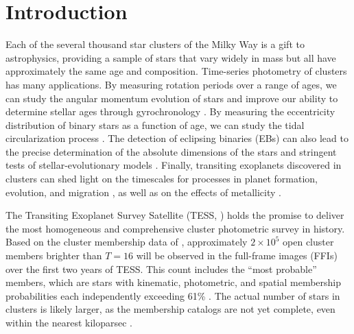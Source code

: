 \documentclass[12pt,twocolumn,tighten,trackchanges]{aastex62}
\begin{document}



\section{Introduction}
\label{sec:intro}

Each of the several thousand star clusters of the Milky Way is a gift
to astrophysics, providing a sample of stars that vary widely in mass
but all have approximately the same age and composition.  Time-series
photometry of clusters has many applications. By measuring rotation
periods over a range of ages, we can study the angular momentum
evolution of stars and improve our ability to determine stellar ages
through gyrochronology \citep[{\it
e.g.},][]{skumanich_time_1972,barnes_color-period_2015,meibom_spin-down_2015,curtis_tess_2019}.
By measuring the eccentricity distribution of binary stars as a
function of age, we can study the tidal circularization process
\citep{meibom_robust_2005,milliman_wiyn_2014,price-whelan_binary_2018}.
The detection of eclipsing binaries (EBs) can also lead to the precise
determination of the absolute dimensions of the stars and stringent
tests of stellar-evolutionary models
\citep{luhman_formation_2012,stassun_review_2014,kraus_mass-radius_2015}.
Finally, transiting exoplanets discovered in clusters can shed light
on the timescales for processes in planet formation, evolution, and
migration
\citep[][]{Fortney_et_al_2007,Mann_K2_33b_2016,David_et_al_2017}, as
well as on the effects of metallicity
\citep[][]{fischer_planet-metallicity_2005,petigura_metallicity_2018}.

The Transiting Exoplanet Survey Satellite (TESS,
\citealt{ricker_transiting_2015}) holds the promise to deliver the
most homogeneous and comprehensive cluster photometric survey in
history.  Based on the cluster membership data of
\citet{Kharchenko_et_al_2013}, approximately $2\times10^5$ open
cluster members brighter than $T=16$ will be observed in the
full-frame images (FFIs) over the first two years of TESS.  This count includes the
\citeauthor{Kharchenko_et_al_2013} ``most probable'' members, which
are stars
with kinematic, photometric, and spatial membership
probabilities each independently exceeding 61\% \citep{kharchenko_global_2012}.  The
actual number of stars in clusters is likely larger, as the membership
catalogs are not yet complete, even within the nearest kiloparsec
\citep[{\it
e.g.},][]{roser_nine_RSG_2016,cantat-gaudin_gaia_2018,cantat-gaudin_newOCs_2019,kounkel_untangling_2019,sim_open_2019}.
\end{document}
